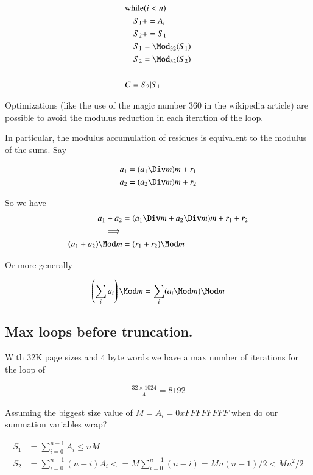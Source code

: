 \documentclass{article}
\begin{document}
\begin{align*}
&\text{while} ( i < n )  \\
&\quad   S_1 += A_i \\
&\quad   S_2 += S_1 \\
&\quad   S_1 = \Mod_{32}(S_1) \\
&\quad   S_2 = \Mod_{32}(S_2) \\
\\
&C = S_2 | S_1
\end{align*}

Optimizations (like the use of the magic number 360 in the wikipedia article) are possible to avoid the modulus reduction in each iteration of the loop.

In particular, the modulus accumulation of residues is equivalent to the modulus of the sums.  Say

\begin{align*}
a_1 &= (a_1 \Div m ) m + r_1 \\
a_2 &= (a_2 \Div m ) m + r_2
\end{align*}

So we have
\begin{align*}
a_1 + a_2 &= (a_1 \Div m + a_2 \Div m ) m + r_1 + r_2 \\
\implies \\
(a_1 + a_2) \Mod m &= (r_1 + r_2) \Mod m \\
\end{align*}

Or more generally

\begin{align*}
\left(\sum_i a_i \right) \Mod m &= \sum_i (a_i \Mod m) \Mod m \\
\end{align*}

\subsection{Max loops before truncation. }

With 32K page sizes and 4 byte words we have a max number of iterations for the loop of

\begin{align*}
\frac{32 \times 1024 }{4} = 8192 
\end{align*}

Assuming the biggest size value of $M = A_i = 0xFFFFFFFF$ when do our summation variables wrap?

\begin{align*}
S_1 &= \sum_{i=0}^{n-1} A_i \le n M \\
S_2 &= \sum_{i=0}^{n-1} (n-i)A_i <= M \sum_{i=0}^{n-1} (n-i) = M n(n-1)/2 < M n^2/2
\end{align*}
\end{document}

